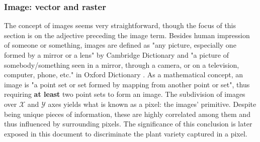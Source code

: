 \subsubsection{Image: vector and raster}
\label{sec:rs_data_formats}

The concept of images seems very straightforward, though the focus of this section is on the adjective preceding the image term. Besides human impression of someone or something, images are defined as "any picture, especially one formed by a mirror or a lens" by Cambridge Dictionary \cite{cambridge_english_dictionary_cambridge_2023} and "a picture of somebody/something seen in a mirror, through a camera, or on a television, computer, phone, etc." in Oxford Dictionary \cite{oxford_university_press_oxford_2023}. As a mathematical concept, an image is "a point set or set formed by mapping from another point or set", thus requiring \textbf{at least} two point sets to form an image. The subdivision of images over $\mathcal{X}$ and $\mathcal{Y}$ axes yields what is known as a pixel: the images' primitive. Despite being unique pieces of information, these are highly correlated among them and thus influenced by surrounding pixels. The significance of this conclusion is later exposed in this document to discriminate the plant variety captured in a pixel.

